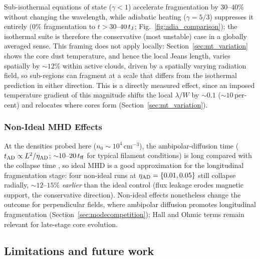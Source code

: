 \documentclass[usenatbib,twoside,twocolumn]{mnras}
\begin{document}
Sub-isothermal equations of state ($\gamma<1$) accelerate fragmentation by $30$--$40\%$ without changing the wavelength, while adiabatic heating ($\gamma=5/3$) suppresses it entirely (0\% fragmentation to $t>30$--$40\,t_{\rm J}$; Fig.~\ref{fig:adia_comparison}); the isothermal suite is therefore the conservative (most unstable) case in a globally averaged sense. This framing does not apply locally: Section~\ref{sec:mt_variation} shows the core dust temperature, and hence the local Jeans length, varies spatially by $\sim12\%$ within active clouds, driven by a spatially varying radiation field, so sub-regions can fragment at a scale that differs from the isothermal prediction in either direction. This is a directly measured effect, since an imposed temperature gradient of this magnitude shifts the local $\lambda/W$ by $\sim0.1$ ($\sim10$\,per-cent) and relocates where cores form (Section~\ref{sec:mt_variation}).

\subsubsection{Non-Ideal MHD Effects}
\label{sec:nonideal}

At the densities probed here ($n_0\sim10^4$\,cm$^{-3}$), the ambipolar-diffusion time ($t_{\rm AD}\propto L^2/\eta_{\rm AD}$; $\sim10$--$20\,t_{\rm ff}$ for typical filament conditions) is long compared with the collapse time \citep{Tassis2004}, so ideal MHD is a good approximation for the longitudinal fragmentation stage: four non-ideal runs at $\eta_{\rm AD}=\{0.01,0.05\}$ still collapse radially, $\sim12$--$15\%$ \textit{earlier} than the ideal control (flux leakage erodes magnetic support, the conservative direction). Non-ideal effects nonetheless change the outcome for perpendicular fields, where ambipolar diffusion promotes longitudinal fragmentation (Section~\ref{sec:modecompetition}); Hall and Ohmic terms remain relevant for late-stage core evolution.

\subsection{Limitations and future work}
\label{sec:limitations}
\end{document}
